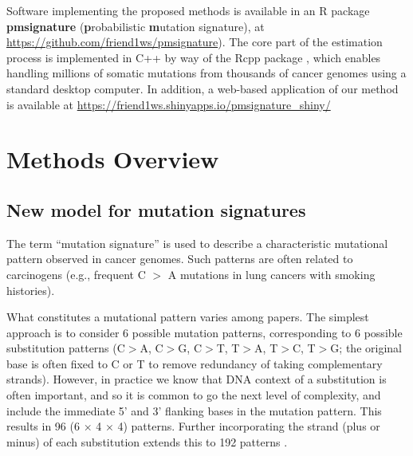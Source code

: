 \documentclass[10pt,letterpaper]{article}
\begin{document}

Software implementing the proposed methods is available in an R package 
{\bf pmsignature} ({\bf p}robabilistic {\bf m}utation signature),
at \url{https://github.com/friend1ws/pmsignature}).
The core part of the estimation process is implemented in C++ by way of the Rcpp package \cite{eddelbuettel2011rcpp},
which enables handling millions of somatic mutations from thousands of cancer genomes using a standard desktop computer.
In addition, a web-based application of our method is available at 
\url{https://friend1ws.shinyapps.io/pmsignature_shiny/}


\section*{Methods Overview}

\subsection*{New model for mutation signatures}

The term ``mutation signature'' is used to describe a characteristic mutational pattern observed in cancer genomes. Such patterns are often related to carcinogens (e.g., frequent C $>$ A mutations in lung cancers with smoking histories).

What constitutes a mutational pattern varies among papers.
The simplest approach is to consider 6 possible mutation patterns, corresponding to
6 possible substitution patterns (C$>$A, C$>$G, C$>$T, T$>$A, T$>$C, T$>$G; the original base is often fixed to C or T to remove redundancy of taking complementary strands).
However, in practice we know that DNA context of a substitution is often important, and so it is common to go the next level of complexity, and include the immediate 5' and 3' flanking bases in the mutation pattern.
This results in 96 (6 $\times$ 4 $\times$ 4) patterns. 
Further incorporating the strand (plus or minus) of each substitution extends this to 192 patterns \cite{pmid23945592, pmid23318258}. 
\end{document}
